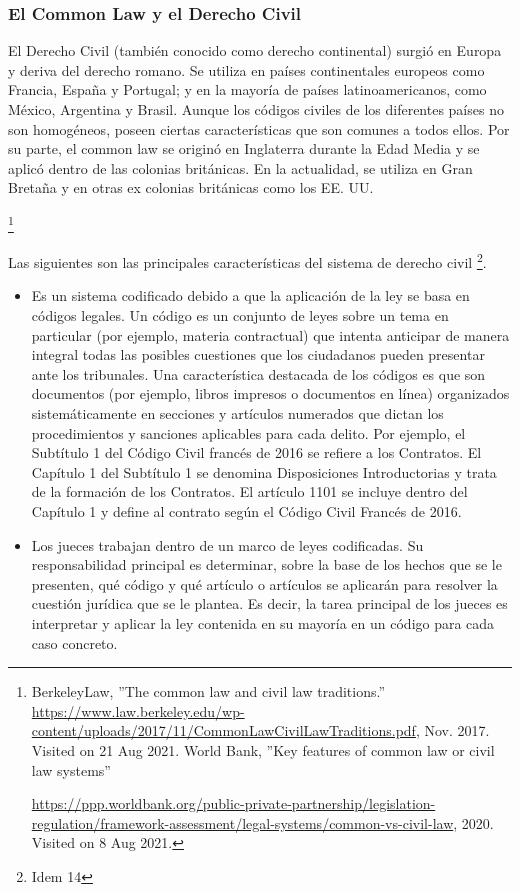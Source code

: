 \documentclass[12pt]{report} %
\begin{document}
\begin{itemize}
\subsubsection{El Common Law y el Derecho Civil}

El Derecho Civil (también conocido como derecho continental) surgió en Europa y deriva del derecho romano. Se utiliza en países continentales europeos como Francia, España y Portugal; y en la mayoría de países latinoamericanos, como México, Argentina y Brasil. Aunque los códigos civiles de los diferentes países no son homogéneos, poseen ciertas características que son comunes a todos ellos. Por su parte, el common law se originó en Inglaterra durante la Edad Media y se aplicó dentro de las colonias británicas. En la actualidad, se utiliza en Gran Bretaña y en otras ex colonias británicas como los EE. UU.

\footnote{BerkeleyLaw, ''The common law and civil law traditions.'' \url{https://www.law.berkeley.edu/wp-content/uploads/2017/11/CommonLawCivilLawTraditions.pdf}, Nov. 2017. Visited on 21 Aug 2021. World Bank, ''Key features of common law or civil law systems''

\url{https://ppp.worldbank.org/public-private-partnership/legislation-regulation/framework-assessment/legal-systems/common-vs-civil-law}, 2020. Visited on 8 Aug 2021.} 

Las siguientes son las principales características del sistema de derecho civil \footnote{Idem 14}.


\begin{itemize}
    \item Es un sistema codificado debido a que la aplicación de la ley se basa en códigos legales. Un código es un conjunto de leyes sobre un tema en particular (por ejemplo, materia contractual) que intenta anticipar de manera integral todas las posibles cuestiones que los ciudadanos pueden presentar ante los tribunales. Una característica destacada de los códigos es que son documentos (por ejemplo, libros impresos o documentos en línea) organizados sistemáticamente en secciones y artículos numerados que dictan los procedimientos y sanciones aplicables para cada delito. Por ejemplo, el Subtítulo 1 del Código Civil francés de 2016  se refiere a los Contratos. El Capítulo 1 del Subtítulo 1 se denomina Disposiciones Introductorias y trata de la formación de los Contratos. El artículo 1101 se incluye dentro del Capítulo 1 y define al contrato según el Código Civil Francés de 2016.
    \item	Los jueces trabajan dentro de un marco de leyes codificadas. Su responsabilidad principal es determinar, sobre la base de los hechos que se le presenten, qué código y qué artículo o artículos se aplicarán para resolver la cuestión jurídica que se le plantea. Es decir, la tarea principal de los jueces es interpretar y aplicar la ley contenida en su mayoría en un código para cada caso concreto.


\end{itemize}
\end{itemize}
\end{document}
